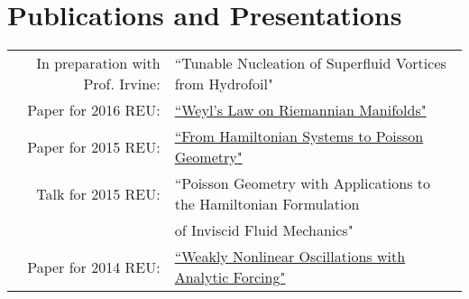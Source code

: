\documentclass[10pt]{article} %
\begin{document}

\section{Publications and Presentations}

\begin{tabular}{rl}

In preparation with Prof. Irvine:& ``Tunable Nucleation of Superfluid Vortices from Hydrofoil"\\

Paper for 2016 REU:& \href{http://math.uchicago.edu/~may/REU2016/REUPapers/Musser.pdf}{``Weyl's Law on Riemannian Manifolds"}\\

Paper for 2015 REU:& \href{http://math.uchicago.edu/~may/REUDOCS/Musser.pdf}{``From Hamiltonian Systems to Poisson Geometry"}\\

Talk for 2015 REU:& ``Poisson Geometry with Applications to the Hamiltonian Formulation\\
&of Inviscid Fluid Mechanics"\\

Paper for 2014 REU:& \href{http://math.uchicago.edu/~may/REU2014/REUPapers/Musser.pdf}{``Weakly Nonlinear Oscillations with Analytic Forcing"}\\
\end{tabular}


\end{document}
